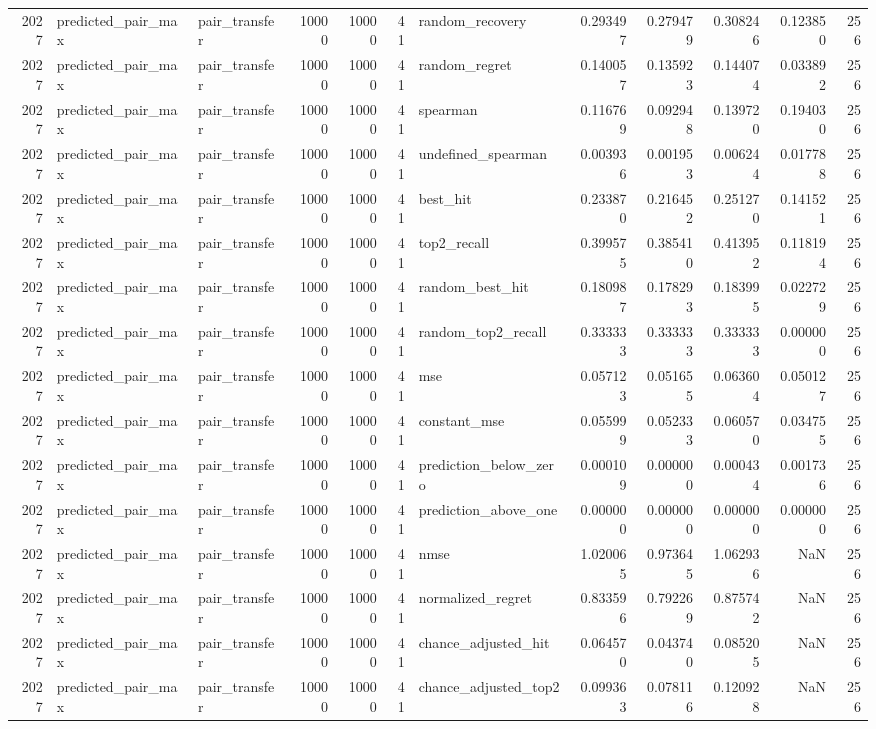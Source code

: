 \begin{tabular}{rllrrrlrrrrr}
2027 & predicted_pair_max & pair_transfer & 10000 & 10000 & 41 & random_recovery & 0.293497 & 0.279479 & 0.308246 & 0.123850 & 256 \\
2027 & predicted_pair_max & pair_transfer & 10000 & 10000 & 41 & random_regret & 0.140057 & 0.135923 & 0.144074 & 0.033892 & 256 \\
2027 & predicted_pair_max & pair_transfer & 10000 & 10000 & 41 & spearman & 0.116769 & 0.092948 & 0.139720 & 0.194030 & 256 \\
2027 & predicted_pair_max & pair_transfer & 10000 & 10000 & 41 & undefined_spearman & 0.003936 & 0.001953 & 0.006244 & 0.017788 & 256 \\
2027 & predicted_pair_max & pair_transfer & 10000 & 10000 & 41 & best_hit & 0.233870 & 0.216452 & 0.251270 & 0.141521 & 256 \\
2027 & predicted_pair_max & pair_transfer & 10000 & 10000 & 41 & top2_recall & 0.399575 & 0.385410 & 0.413952 & 0.118194 & 256 \\
2027 & predicted_pair_max & pair_transfer & 10000 & 10000 & 41 & random_best_hit & 0.180987 & 0.178293 & 0.183995 & 0.022729 & 256 \\
2027 & predicted_pair_max & pair_transfer & 10000 & 10000 & 41 & random_top2_recall & 0.333333 & 0.333333 & 0.333333 & 0.000000 & 256 \\
2027 & predicted_pair_max & pair_transfer & 10000 & 10000 & 41 & mse & 0.057123 & 0.051655 & 0.063604 & 0.050127 & 256 \\
2027 & predicted_pair_max & pair_transfer & 10000 & 10000 & 41 & constant_mse & 0.055999 & 0.052333 & 0.060570 & 0.034755 & 256 \\
2027 & predicted_pair_max & pair_transfer & 10000 & 10000 & 41 & prediction_below_zero & 0.000109 & 0.000000 & 0.000434 & 0.001736 & 256 \\
2027 & predicted_pair_max & pair_transfer & 10000 & 10000 & 41 & prediction_above_one & 0.000000 & 0.000000 & 0.000000 & 0.000000 & 256 \\
2027 & predicted_pair_max & pair_transfer & 10000 & 10000 & 41 & nmse & 1.020065 & 0.973645 & 1.062936 & NaN & 256 \\
2027 & predicted_pair_max & pair_transfer & 10000 & 10000 & 41 & normalized_regret & 0.833596 & 0.792269 & 0.875742 & NaN & 256 \\
2027 & predicted_pair_max & pair_transfer & 10000 & 10000 & 41 & chance_adjusted_hit & 0.064570 & 0.043740 & 0.085205 & NaN & 256 \\
2027 & predicted_pair_max & pair_transfer & 10000 & 10000 & 41 & chance_adjusted_top2 & 0.099363 & 0.078116 & 0.120928 & NaN & 256 \\

\end{tabular}

